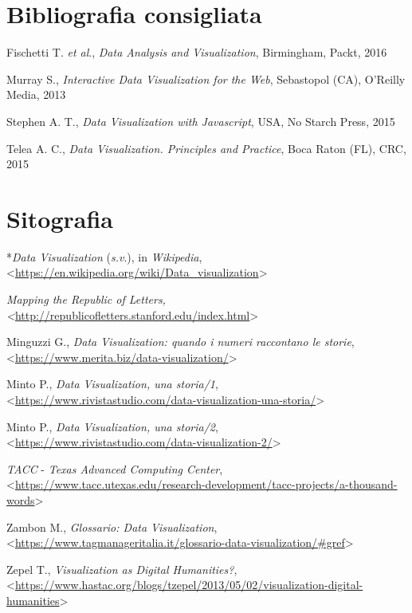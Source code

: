 \documentclass[
  b5paper,
  twoside,
  11pt,
  chapterprefix=false,
  bibliography=totocnumbered,
  parskip=0]{scrbook}
\begin{document}
\hypertarget{bibliografia-consigliata-5}{%
\section*{Bibliografia consigliata}\label{bibliografia-consigliata-5}}

Fischetti T. \emph{et al}., \emph{Data Analysis and Visualization}, Birmingham,
Packt, 2016

Murray S., \emph{Interactive Data Visualization for the Web}, Sebastopol
(CA), O'Reilly Media, 2013

Stephen A. T., \emph{Data Visualization with Javascript}, USA, No Starch
Press, 2015

Telea A. C., \emph{Data Visualization. Principles and Practice}, Boca Raton
(FL), CRC, 2015

\hypertarget{sitografia-7}{%
\section*{Sitografia}\label{sitografia-7}}

*\emph{Data Visualization} (\emph{s.v}.), in \emph{Wikipedia},
\textless{}{\url{https://en.wikipedia.org/wiki/Data_visualization}\textgreater{}}

\emph{Mapping the Republic of Letters,
\textless{}}{\url{http://republicofletters.stanford.edu/index.html}\textgreater{}}

Minguzzi G., \emph{Data Visualization: quando i numeri raccontano le storie},
\textless{}{\url{https://www.merita.biz/data-visualization/}\textgreater{}}

Minto P., \emph{Data Visualization, una storia/1},
\textless{}{\url{https://www.rivistastudio.com/data-visualization-una-storia/}\textgreater{}}

Minto P., \emph{Data Visualization, una storia/2},
\textless{}{\url{https://www.rivistastudio.com/data-visualization-2/}\textgreater{}}

\emph{TACC} - \emph{Texas Advanced Computing Center},
\textless{}{\url{https://www.tacc.utexas.edu/research-development/tacc-projects/a-thousand-words}\textgreater{}}

Zambon M., \emph{Glossario: Data Visualization},
\textless{}{\url{https://www.tagmanageritalia.it/glossario-data-visualization/\#gref}\textgreater{}}

Zepel T., \emph{Visualization as Digital Humanities?},
\textless{}{\url{https://www.hastac.org/blogs/tzepel/2013/05/02/visualization-digital-humanities}\textgreater{}}
\end{document}
